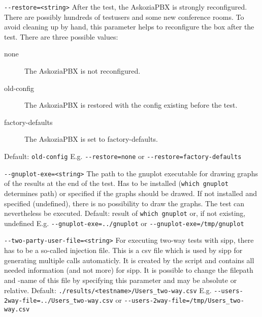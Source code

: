 \begin {description}
\item {\texttt{-{}-restore=<string>}} \newline
After the test, the AskoziaPBX is strongly reconfigured. There are possibly hundreds
of testusers and some new conference rooms. To avoid cleaning up by hand, this parameter
helps to reconfigure the box after the test. There are three possible values:
\begin{description}
	\item [none] The AskoziaPBX is not reconfigured.
	\item [old-config] The AskoziaPBX is restored with the config existing before the test.
	\item [factory-defaults] The AskoziaPBX is set to factory-defaults.
\end{description}
Default: \texttt{old-config}
\newline E.g. \texttt{-{}-restore=none} or \texttt{-{}-restore=factory-defaults}

\item {\texttt{-{}-gnuplot-exe=<string>}} \newline
The path to the gnuplot executable for drawing graphs of the results at the end of the test.
Has to be installed (\texttt{which gnuplot} determines path) or specified if the graphs
should be drawed. If not installed and specified (undefined), there is no possibility to
draw the graphs. The test can nevertheless be executed.
\newline Default: result of \texttt{which gnuplot} or, if not existing, undefined
\newline E.g. \texttt{-{}-gnuplot-exe=../gnuplot} or \texttt{-{}-gnuplot-exe=/tmp/gnuplot}

\item {\texttt{-{}-two-party-user-file=<string>}} \newline
For executing two-way tests with sipp, there has to be a so-called injection file.
This is a csv file which is used by sipp for generating multiple calls automaticly.
It is created by the script and contains all needed information (and not more)
for sipp. It is possible to change the filepath and -name of this file by specifying
this parameter and may be absolute or relative.
\newline Default: \texttt{./results/<testname>/Users\_two-way.csv}
\newline E.g. \texttt{-{}-users-2way-file=../Users\_two-way.csv}
\newline or \texttt{-{}-users-2way-file=/tmp/Users\_two-way.csv}


\end{description}
